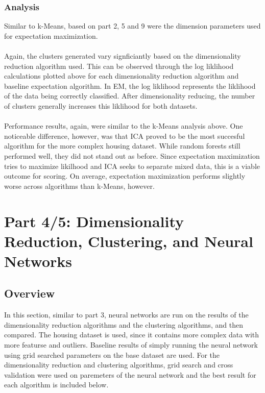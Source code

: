 \documentclass[h]{article}
\begin{document}
\subsubsection*{Analysis}
Similar to k-Means, based on part 2, 5 and 9 were the dimension parameters used for expectation 
maximization. 
\\ \\
Again, the clusters generated vary signficiantly based on the dimensionality 
reduction algorithm used.  This can be observed through the log liklihood 
calculations plotted above for each dimensionality reduction algorithm and 
baseline expectation algorithm.  In EM, the log liklihood represents the liklihood of the data being correctly 
classified.  After dimensionality reducing, the number of clusters generally increases 
this liklihood for both datasets.
\\ \\
Performance results, again, were similar to the k-Means analysis above.  One 
noticeable difference, however, was that ICA proved to be the most succesful 
algorithm for the more complex housing dataset.  While random forests still 
performed well, they did not stand out as before.  Since expectation 
maximization tries to maximize likilhood and ICA seeks to separate mixed data, 
this is a viable outcome for scoring.  On average, expectation maximization 
performs slightly worse across algorithms than k-Means, however.

\section*{Part 4/5: Dimensionality Reduction, Clustering, and Neural Networks}
\subsection*{Overview}
In this section, similar to part 3, neural networks are run on the results of the 
dimensionality reduction algorithms and the clustering algorithms, and then compared.  
The housing dataset is used, since it contains more complex data with more 
featurse and outliers.
 Baseline results of simply running the neural network using grid searched 
 parameters on the base dataset are used.  For the dimensionality reduction and 
 clustering algorithms, grid search and cross validation were used on paremeters of the neural 
 network and the best result for each algorithm is included below.
 
\end{document}
